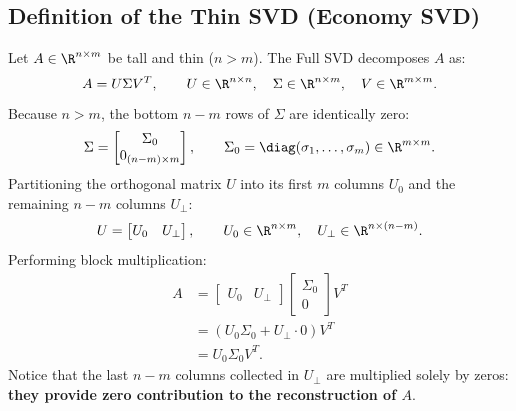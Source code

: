 \subsection{Definition of the Thin SVD (Economy SVD)}

Let $A \in \R^{n \times m}$ be tall and thin ($n > m$). The Full SVD decomposes $A$ as:
\begin{equation}
    A = U \Sigma V^T, \qquad U \in \R^{n \times n}, \quad \Sigma \in \R^{n \times m}, \quad V \in \R^{m \times m}.
\end{equation}
Because $n > m$, the bottom $n - m$ rows of $\Sigma$ are identically zero:
\begin{equation}
    \Sigma = \begin{bmatrix} \Sigma_0 \\ 0_{(n-m) \times m} \end{bmatrix}, \qquad \Sigma_0 = \diag(\sigma_1, \dots, \sigma_m) \in \R^{m \times m}.
\end{equation}
Partitioning the orthogonal matrix $U$ into its first $m$ columns $U_0$ and the remaining $n - m$ columns $U_\perp$:
\begin{equation}
    U = \begin{bmatrix} U_0 & U_\perp \end{bmatrix}, \qquad U_0 \in \R^{n \times m}, \quad U_\perp \in \R^{n \times (n - m)}.
\end{equation}
Performing block multiplication:
\begin{align}
    A &= \begin{bmatrix} U_0 & U_\perp \end{bmatrix} \begin{bmatrix} \Sigma_0 \\ 0 \end{bmatrix} V^T \nonumber \\
      &= \left( U_0 \Sigma_0 + U_\perp \cdot 0 \right) V^T \nonumber \\
      &= U_0 \Sigma_0 V^T.
\end{align}
Notice that the last $n - m$ columns collected in $U_\perp$ are multiplied solely by zeros: \textbf{they provide zero contribution to the reconstruction of $A$}.

